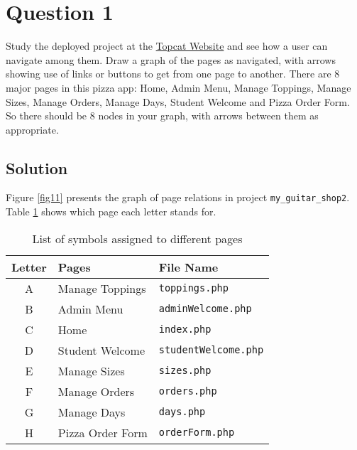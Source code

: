 
\section*{Question 1}

Study the deployed project at the \href{http://topcat.cs.umb.edu:11600/pizza3}{Topcat Website} and see how a user can navigate among them.
Draw a graph of the pages as navigated, with arrows showing use of links or buttons to get from one page to another.
There are 8 major pages in this pizza app: Home, Admin Menu, Manage Toppings, Manage Sizes, Manage Orders, Manage Days, Student Welcome and Pizza Order Form.
So there should be 8 nodes in your graph, with arrows between them as appropriate.

\subsection*{Solution}

Figure \ref{fig11} presents the graph of page relations in project \texttt{my\_guitar\_shop2}.
Table \ref{tab11} shows which page each letter stands for.

\begin{table}[H] \centering
\begin{tabular}{c | l | l}
Letter & Pages & File Name\\
\hline
A & Manage Toppings & \texttt{toppings.php}\\
B & Admin Menu & \texttt{adminWelcome.php}\\
C & Home & \texttt{index.php}\\
D & Student Welcome & \texttt{studentWelcome.php} \\
E & Manage Sizes & \texttt{sizes.php} \\
F & Manage Orders & \texttt{orders.php} \\
G & Manage Days & \texttt{days.php} \\
H & Pizza Order Form & \texttt{orderForm.php} \\
\end{tabular}
\caption{List of symbols assigned to different pages}\label{tab11}
\end{table}

